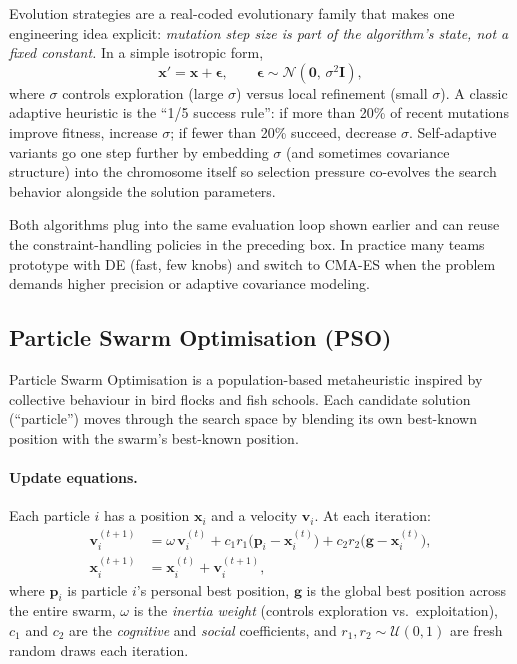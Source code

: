 \begin{tcolorbox}[summarybox, title={Evolution strategies (ES): step-size adaptation and self-adaptation}]
Evolution strategies are a real-coded evolutionary family that makes one engineering idea explicit: \emph{mutation step size is part of the algorithm's state, not a fixed constant.} In a simple isotropic form,
\[
\mathbf{x}'=\mathbf{x}+\boldsymbol{\epsilon},\qquad \boldsymbol{\epsilon}\sim\mathcal{N}(\mathbf{0},\,\sigma^2\mathbf{I}),
\]
where \(\sigma\) controls exploration (large \(\sigma\)) versus local refinement (small \(\sigma\)). A classic adaptive heuristic is the ``1/5 success rule'': if more than 20\% of recent mutations improve fitness, increase \(\sigma\); if fewer than 20\% succeed, decrease \(\sigma\). Self-adaptive variants go one step further by embedding \(\sigma\) (and sometimes covariance structure) into the chromosome itself so selection pressure co-evolves the search behavior alongside the solution parameters.
\end{tcolorbox}

Both algorithms plug into the same evaluation loop shown earlier and can reuse the constraint-handling policies in the preceding box. In practice many teams prototype with DE (fast, few knobs) and switch to CMA-ES when the problem demands higher precision or adaptive covariance modeling.

\subsection{Particle Swarm Optimisation (PSO)}
\label{sec:evo_particle_swarm_optimisation}

Particle Swarm Optimisation is a population-based metaheuristic inspired by collective behaviour in bird flocks and fish schools. Each candidate solution (``particle'') moves through the search space by blending its own best-known position with the swarm's best-known position.

\paragraph{Update equations.}
Each particle \(i\) has a position \(\mathbf{x}_i\) and a velocity \(\mathbf{v}_i\). At each iteration:
\begin{align*}
  \mathbf{v}_i^{(t+1)} &= \omega \, \mathbf{v}_i^{(t)}
    + c_1 r_1 \bigl(\mathbf{p}_i - \mathbf{x}_i^{(t)}\bigr)
    + c_2 r_2 \bigl(\mathbf{g} - \mathbf{x}_i^{(t)}\bigr), \\
  \mathbf{x}_i^{(t+1)} &= \mathbf{x}_i^{(t)} + \mathbf{v}_i^{(t+1)},
\end{align*}
where \(\mathbf{p}_i\) is particle \(i\)'s personal best position, \(\mathbf{g}\) is the global best position across the entire swarm, \(\omega\) is the \emph{inertia weight} (controls exploration vs.\ exploitation), \(c_1\) and \(c_2\) are the \emph{cognitive} and \emph{social} coefficients, and \(r_1, r_2 \sim \mathcal{U}(0,1)\) are fresh random draws each iteration.

